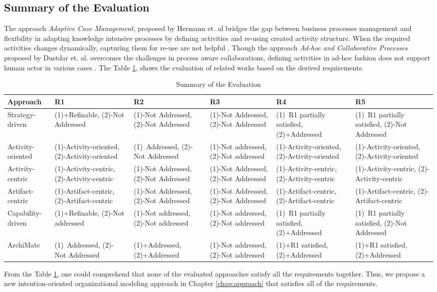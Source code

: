 \subsection {Summary of the Evaluation}
 The approach \textit{Adaptive Case Management}, proposed by Hermann et. al \cite{Herrmann2011} bridges the gap between business processes management and flexibility in adapting knowledge intensive processes by defining activities and re-using created activity structure. When the required activities changes dynamically, capturing them for re-use are not helpful \cite{Sungur2015}. Though the approach \textit{Ad-hoc and Collaborative Processes} proposed by Dustdar et. al. overcomes the challenges in process aware collaborations, defining activities in ad-hoc fashion does not support human actor in various cases \cite{Sungur2015}. The Table \ref{tab:evaluationoftheapproach}, shows the evaluation of related works based on the derived requirements. 

\begin{table}[]
	\scriptsize 
	\centering
	\begin{tabular}{p{2cm}p{2.1cm}p{2.3cm}p{2.3cm}p{2.3cm}p{2.3cm}}
	\toprule
		Approach & R1               & R2               & R3         & R4       & R5        \\
	\midrule
	Strategy-driven& (1)+Refinable, (2)-Not Addressed& (1)-Not Addressed, (2)-Not Addressed& (1)-Not Addressed, (2)-Not Addressed& (1)~R1 partially satisfied, (2)+Addressed& (1)~R1 partially satisfied, (2)-Not Addressed \\
	Activity-oriented & (1)-Activity-oriented, (2)-Activity-oriented &(1)~Addressed, (2)- Not Addressed& (1)-Not addressed, (2)-Not addressed&(1)-Activity-oriented, (2)-Activity-oriented&(1)-Activity-oriented, (2)-Activity-oriented \\
	Activity-centric & (1)-Activity-centric, (2)-Activity-centric  & (1)-Not Addressed, (2)-Not Addressed  & (1)-Not Addressed, (2)-Not Addressed&  (1)-Activity-centric, (2)-Activity-centric &  (1)-Activity-centric, (2)-Activity-centric \\
	Artifact-centric    & (1)-Artifact-centric, (2)-Artifact-centric  & (1)-Not Addressed, (2)-Not Addressed  & (1)-Not Addressed, (2)-Not Addressed  & (1)-Artifact-centric, (2)-Artifact-centric & (1)-Artifact-centric, (2)-Artifact-centric  \\ 
	Capability-driven   & (1)+Refinable, (2)-Not addressed & (1)-Not addressed, (2)-Not addressed   & (1)-Not addressed, (2)-Not addressed  & (1)~R1 partially satisfied, (2)+Addressed  & (1)~R1 partially satisfied, (2)-Not Addressed  \\
	ArchiMate  & (1)~Addressed, (2)- Not Addressed & (1)+Addressed, (2)+Addressed & (1)-Not addressed, (2)-Not addressed  & (1)+R1 satisfied, (2)+Addressed & (1)+R1 satisfied, (2)+Addressed\\
	\bottomrule   
	\end{tabular}
	\caption{Summary of the Evaluation}
	\label{tab:evaluationoftheapproach}  
\end{table}


From the Table \ref{tab:evaluationoftheapproach}, one could comprehend that none of the evaluated approaches satisfy all the requirements together. Thus, we propose a new intention-oriented organizational modeling approach in Chapter \ref{chap:approach} that satisfies all of the requirements. 
 



